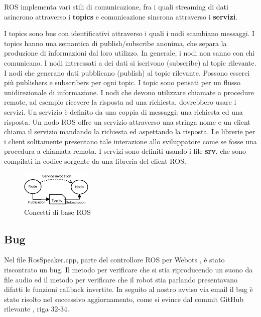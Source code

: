 \documentclass[a4paper]{article}
\begin{document}
	ROS implementa vari stili di comunicazione, fra i quali streaming di dati
	asincrono attraverso i \textbf{topics} e comunicazione sincrona attraverso
	i \textbf{servizi}. 

	I topics sono bus con identificativi attraverso i quali i nodi scambiano
	messaggi. I topics hanno una semantica di publish/subscribe anonima, che
	separa la produzione di informazioni dal loro utilizzo. In generale, i nodi
	non sanno con chi comunicano. I nodi interessati a dei dati si iscrivono
	(subscribe) al topic rilevante. I nodi che generano dati pubblicano
	(publish) al topic rilevante. Possono esserci più publishers e subscribers
	per ogni topic. I topic sono pensati per un flusso unidirezionale di
	informazione. I nodi che devono utilizzare chiamate a procedure remote, ad
	esempio ricevere la risposta ad una richiesta, dovrebbero usare i servizi.
	Un servizio è definito da una coppia di messaggi: una richiesta ed una
	risposta. 
	Un nodo ROS offre un servizio attraverso una stringa nome e un
	client chiama il servizio mandando la richiesta ed aspettando la risposta.
	Le librerie per i client solitamente presentano tale interazione allo
	sviluppatore come se fosse una procedura a chiamata remota. I servizi sono
	definiti usando i file \textbf{srv}, che sono compilati in codice sorgente
	da una libreria del client ROS.
	
	\begin{figure}[H]
		\centering
		\includegraphics[width=0.3\textwidth]{./img/ROS_basic_concepts.pdf}
		\caption{Concetti di base ROS}
		\label{fig:ros_concepts}
	\end{figure}
	
	\subsection{Bug}\label{subsec:Bug}
	Nel file RosSpeaker.cpp, parte del controllore ROS per Webots
	\cite{cyberbotics}, è stato riscontrato un bug. Il metodo per verificare
	che si stia riproducendo un suono da file audio ed il metodo per verificare
	che il robot stia parlando presentavano difatti le funzioni callback
	invertite. In seguito al nostro avviso via email il bug è stato risolto nel
	successivo aggiornamento, come si evince dal commit GitHub rilevante
	\cite{rosbug}, riga 32-34.
	
\end{document}
